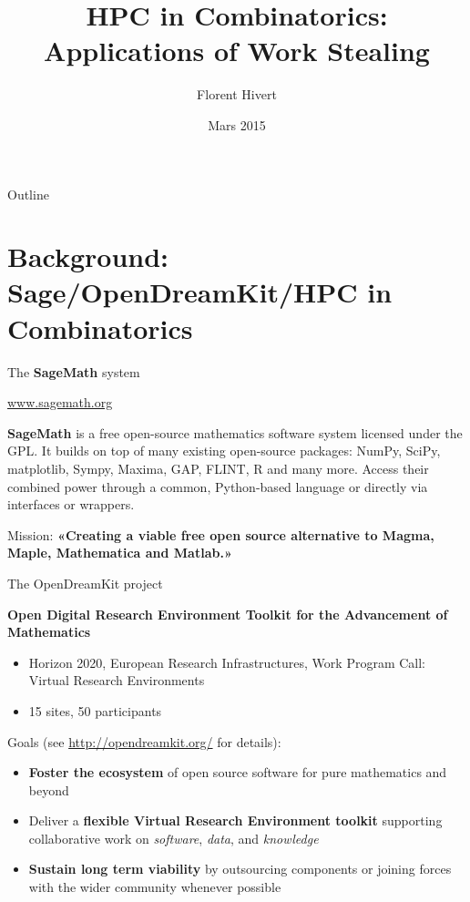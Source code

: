 \documentclass[compress,11pt]{beamer}
\title{\bf\LARGE HPC in Combinatorics:  \\
Applications of Work Stealing\\[5mm]}
\author{Florent Hivert}
\institute[LRI]{
  LRI / Université Paris Sud 11 / CNRS}
\date[Décembre 2014]{Mars 2015}
\begin{document}
\frame{\titlepage}

\begin{frame}{Outline}

  \tableofcontents
\end{frame}


\section{Background: Sage/OpenDreamKit/HPC in Combinatorics}
\begin{frame}{The \textbf{SageMath} system}

  \centering
  \url{www.sagemath.org}
  \bigskip

  \textbf{SageMath} is a {\color{green} free open-source mathematics software}
  system licensed under the GPL. It builds on top of many existing open-source
  packages: NumPy, SciPy, matplotlib, Sympy, Maxima, GAP, FLINT, R and many
  more. Access their combined power through a common, {\color{green}
    Python}-based language or directly via interfaces or wrappers.  \bigskip

  Mission: \textbf{«Creating a {\color{red} viable free open source
      alternative} to Magma, Maple, Mathematica and Matlab.»}
\end{frame}

\begin{frame}[fragile]{The OpenDreamKit project}

  \textbf{\Large Open Digital Research Environment Toolkit for the
    Advancement of Mathematics}
  \begin{itemize}
  \item Horizon 2020, European Research Infrastructures, Work Program
    Call: Virtual Research Environments
  \item 15 sites, 50 participants
  \end{itemize}
  {\color{red} Goals} (see {\color{blue}\url{http://opendreamkit.org/}} for details):
  \begin{itemize}
  \item \textbf{Foster the ecosystem} of open source software for pure
    mathematics and beyond
  \item Deliver a \textbf{flexible Virtual Research Environment toolkit} supporting
    collaborative work on \emph{software}, \emph{data}, and \emph{knowledge}
  \item \textbf{Sustain long term viability} by outsourcing components or
    joining forces with the wider community whenever possible
  \end{itemize}
\end{frame}
\end{document}
